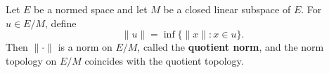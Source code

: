 Let $E$ be a normed space and let $M$ be a closed linear subspace of $E$. For $u \in E/M$, define
$$\|u\| = \inf \{ \|x\| : x \in u \}.$$
Then $\|\cdot\|$ is a norm on $E/M$, called the \textbf{quotient norm}, and the norm topology on $E/M$ coincides with the quotient topology.
